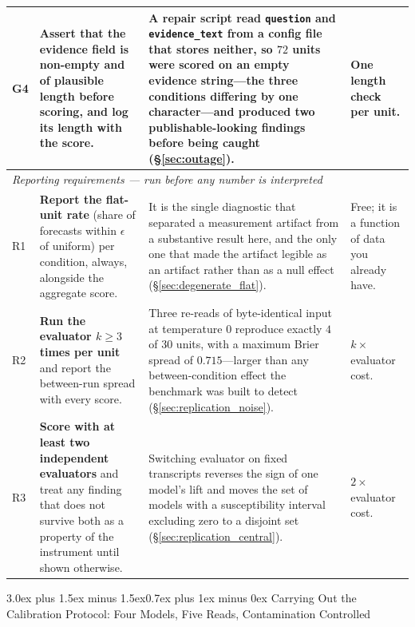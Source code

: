 \documentclass[11pt,journal,onecolumn]{IEEEtran}
\makeatletter
\renewcommand\section{\@startsection{section}{1}{\z@}%
  {3.0ex plus 1.5ex minus 1.5ex}{0.7ex plus 1ex minus 0ex}%
  {\normalfont\normalsize\centering\bfseries}}
\makeatother
\begin{document}
\begin{table}[!htbp]
\begin{tabular}{p{}>{\raggedright\arraybackslash}p{}>{\raggedright\arraybackslash}p{}>{\raggedright\arraybackslash}p{}}
\addlinespace
G4 & \textbf{Assert that the evidence field is non-empty and of plausible length} before scoring, and log its length with the score. & A repair script read \texttt{question} and \texttt{evidence\_text} from a config file that stores neither, so $72$ units were scored on an empty evidence string---the three conditions differing by one character---and produced two publishable-looking findings before being caught (\S\ref{sec:outage}). & One length check per unit. \\
\midrule
\multicolumn{4}{l}{\emph{Reporting requirements --- run before any number is interpreted}} \\
\midrule
R1 & \textbf{Report the flat-unit rate} (share of forecasts within $\epsilon$ of uniform) per condition, always, alongside the aggregate score. & It is the single diagnostic that separated a measurement artifact from a substantive result here, and the only one that made the artifact legible as an artifact rather than as a null effect (\S\ref{sec:degenerate_flat}). & Free; it is a function of data you already have. \\
\addlinespace
R2 & \textbf{Run the evaluator $k \geq 3$ times per unit} and report the between-run spread with every score. & Three re-reads of byte-identical input at temperature $0$ reproduce exactly $4$ of $30$ units, with a maximum Brier spread of $0.715$---larger than any between-condition effect the benchmark was built to detect (\S\ref{sec:replication_noise}). & $k\times$ evaluator cost. \\
\addlinespace
R3 & \textbf{Score with at least two independent evaluators} and treat any finding that does not survive both as a property of the instrument until shown otherwise. & Switching evaluator on fixed transcripts reverses the sign of one model's lift and moves the set of models with a susceptibility interval excluding zero to a disjoint set (\S\ref{sec:replication_central}). & $2\times$ evaluator cost. \\
\bottomrule
\end{tabular}
\setlength{\tabcolsep}{6pt}
\end{table}

\section{Carrying Out the Calibration Protocol: Four Models, Five Reads, Contamination Controlled}
\label{sec:four_model_extension}
\end{document}
